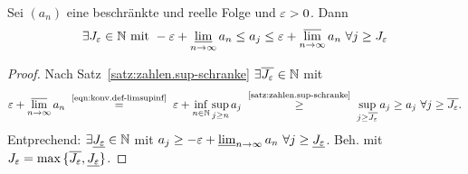 \documentclass[12pt]{scrreprt}
\begin{document}
\begin{lem}
  \label{lem:konv.lim-ep}
  Sei $(a_n)$ eine beschränkte und reelle Folge und $\varepsilon>0$. Dann
  \[\exists J_\varepsilon\in\mathbb{N} \text{ mit } -\varepsilon+\varliminf_{n\rightarrow\infty}{a_n} \le a_j \le
  \varepsilon+\varlimsup_{n\rightarrow\infty}{a_n}\ \forall j \ge J_\varepsilon \]
\end{lem}
\begin{proof}
  Nach Satz~\ref{satz:zahlen.sup-schranke} $\exists \overline{J_\varepsilon}\in\mathbb{N}$
  mit \[\ep+\ls_{\ninf}{a_n} \nach{=}{\ref{eqn:konv.def-limsupinf}} \ep
  + \inf_{\nat{n}}{\sup_{j\ge n}{a_j}}
  \nach{\ge}{\ref{satz:zahlen.sup-schranke}}
  \sup_{j\ge\overline{J_\ep}}{a_j} \ge a_j \ \forall
  j\ge\overline{J_\ep}.\]
  Entprechend: $\exists \underline{J_\varepsilon}\in\mathbb{N}$ mit $a_j \ge -\varepsilon +
  \varliminf_{n\rightarrow\infty}{a_n} \ \forall j\ge\underline{J_\varepsilon}$. \folgt Beh. mit $J_\varepsilon = \max{\{\overline{J_\varepsilon}, \underline{J_\varepsilon}\}}$.
\end{proof}
\end{document}
